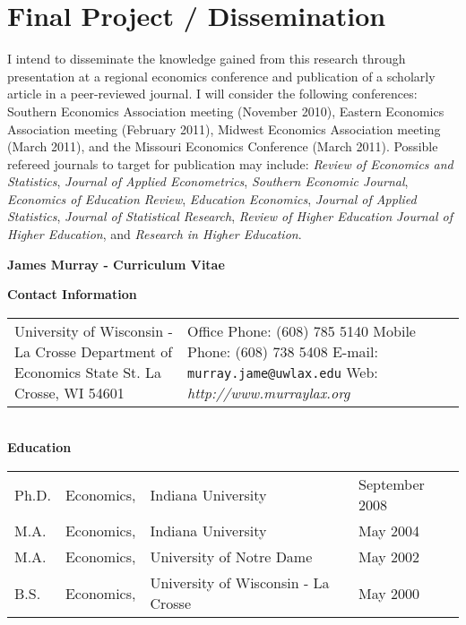 \documentclass[11pt]{article}
\newcommand{\toprule}{\par\vspace*{2pt}\noindent{\hrule\hfill}\par\vspace*{1pt}}
\begin{document}
\section{Final Project / Dissemination}
I intend to disseminate the knowledge gained from this research through presentation at a regional economics conference and publication of a scholarly article in a peer-reviewed journal.  I will consider the following conferences: Southern Economics Association meeting (November 2010), Eastern Economics Association meeting (February 2011), Midwest Economics Association meeting (March 2011), and the Missouri Economics Conference (March 2011).  Possible refereed journals to target for publication may include: \textit{Review of Economics and Statistics}, \textit{Journal of Applied Econometrics}, \textit{Southern Economic Journal}, \textit{Economics of Education Review}, \textit{Education Economics}, \textit{Journal of Applied Statistics}, \textit{Journal of Statistical Research}, \textit{Review of Higher Education} \textit{Journal of Higher Education}, and \textit{Research in Higher Education}.

\newpage

\nocite{*}



\newpage
\begin{center} 
\textbf{\Large{James Murray - Curriculum Vitae}}\\
\end{center}
\small 

\textbf{Contact Information} \toprule
\hspace*{-0.5pc}\begin{tabular}{p{3.4in} p{3in}}
University of Wisconsin - La Crosse\newline
Department of Economics \newline
1725 State St. \newline
La Crosse, WI  54601
&
Office Phone: (608) 785 5140\newline
Mobile Phone: (608) 738 5408\newline
E-mail: \texttt{murray.jame@uwlax.edu}\newline
Web: \textit{http://www.murraylax.org}
\end{tabular} \\

\textbf{Education} \toprule
\hspace*{-0.5pc}\begin{tabular}{p{.5in} p{.6in} p{2.5in} p{2in}}
Ph.D. & Economics, & Indiana University & September 2008 \\
M.A. & Economics, & Indiana University & May 2004  \\
M.A. & Economics, & University of Notre Dame & May 2002 \\
B.S. & Economics, & University of Wisconsin - La Crosse & May 2000 \\
\end{tabular} \\ 
\end{document}
